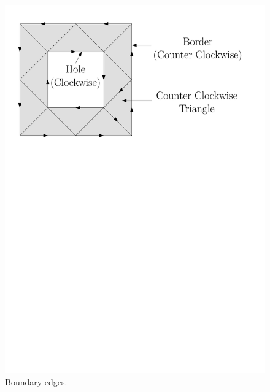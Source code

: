 \begin{figure}[t]
    \centering
    \includegraphics[width=5in]{thesis_SPhd_subfiles/border}
    \caption[Boundary edges]{Boundary edges.}
    \label{fig:Ch1-border}
\end{figure}
